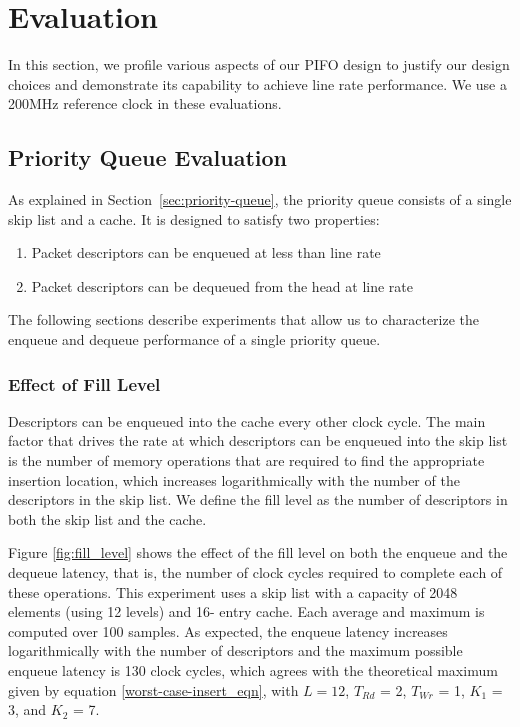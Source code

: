 \section{Evaluation}

In this section, we profile various aspects of our PIFO design to justify our design choices and demonstrate its capability to achieve line rate performance. We use a  200MHz reference clock in these evaluations.

\subsection{Priority Queue Evaluation}

As explained in Section~\ref{sec:priority-queue}, the priority queue consists of a single skip list and a cache. It is designed to satisfy two properties:
\begin{enumerate}
  \item Packet descriptors can be enqueued at less than line rate
  \item Packet descriptors can be dequeued from the head at line rate
\end{enumerate}

The following sections describe experiments that allow us to characterize the enqueue and dequeue performance of a single priority queue.

\subsubsection*{Effect of Fill Level}
Descriptors can be enqueued into the cache every other clock cycle. The main factor that drives the rate at which descriptors can be enqueued into the skip list is the number of memory operations that are required to find the appropriate insertion location, which increases logarithmically with the number of the descriptors in the skip list. We define the fill level as the number of descriptors in both the skip list and the cache.

Figure \ref{fig:fill_level} shows the effect of the fill level on both the enqueue and the dequeue latency, that is, the number of clock cycles required to complete each of these operations. This experiment uses a skip list with a capacity of 2048 elements (using 12 levels) and 16- entry cache. Each average and maximum is computed over 100 samples. As expected, the enqueue latency increases logarithmically with the number of descriptors and the maximum possible enqueue latency is 130 clock cycles, which agrees with the theoretical maximum given by equation \ref{worst-case-insert_eqn}, with $L = 12$, $T_{Rd}$ = 2, $T_{Wr}$ = 1, $K_{1}$ = 3, and $K_{2}$ = 7.

